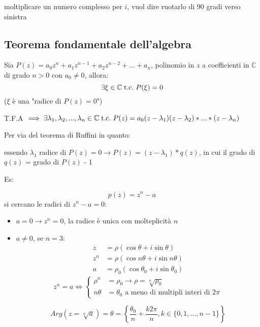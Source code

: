 \documentclass[a4paper,12pt]{article}
\begin{document}
	moltiplicare un numero complesso per $i$, vuol dire ruotarlo di 90 gradi verso sinistra
	
	\subsection{Teorema fondamentale dell'algebra}
	Sia $P(z) = a_0z^n + a_1z^{n-1} + a_2z^{n-2} + ... + a_n$, polinomio in $z$ a coefficienti in $\mathbb{C}$ di grado $n > 0$ con $a_0 \not = 0$, allora:
	\[\exists \xi \in \mathbb{C} \;\text{t.c.}\; P(\xi) = 0\]
	($\xi$ è una "radice di $P(z) = 0$")
	
	T.F.A $\implies \exists \lambda_1, \lambda_2, ..., \lambda_n \in \mathbb{C} \;\text{t.c.}\; P(z) = a_0(z - \lambda_1)(z - \lambda_2) * ... * (z - \lambda_n)$
	
	Per via del teorema di Ruffini in quanto:
	\begin{center}
		essendo $\lambda_1$ radice di $P(z) = 0 \rightarrow P(z) = (z - \lambda_1)*q(z)$, in cui il grado di $q(z)$ = grado di $P(z)$ - 1
	\end{center}
	
	Es:
	
	\[p(z) = z^n - a\]
	si cercano le radici di $z^n - a = 0$:
	\begin{itemize}
		\item $a = 0 \rightarrow z^n = 0$, la radice è unica con molteplicità $n$
		\item $a \not = 0$, se $n = 3$:
		\[
		\begin{aligned}
			z &= \rho(\cos\theta + i\sin\theta) \\
			z^n &= \rho(\cos n\theta + i\sin n\theta) \\
			a \, \, &= \rho_0(\cos\theta_0 + i\sin\theta_0)
		\end{aligned}
		\]
		\[z^n = a \iff \left\{
		\begin{aligned}
			\rho^n &= \rho_0 \rightarrow \rho = \sqrt[n]{\rho_0}\\
			n\theta &= \theta_0 \text{ a meno di multipli interi di } 2\pi
		\end{aligned} \right.\]
		
		\[Arg(z = \sqrt[n]{a}) = \theta = \left\{\frac{\theta_0}{n} + \frac{k2\pi}{n}, k \in \{0, 1, ..., n -1\}\right\}\]
		
	\end{itemize}
	
	
	
\end{document}
